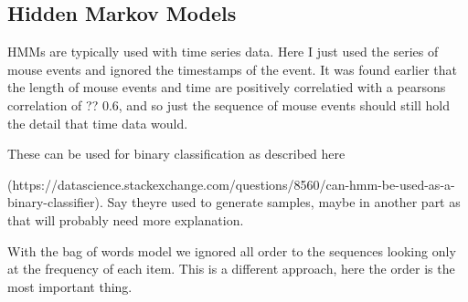 \documentclass{article}
\begin{document}
\subsection{Hidden Markov Models}


HMMs are typically used with time series data.
Here I just used the series of mouse events and ignored the timestamps of the event.
It was found earlier that the length of mouse events and time are positively correlatied with a pearsons correlation of ?? 0.6,
 and so just the sequence of mouse events should still hold the detail that time data would.

These can be used for binary classification as described here 

(https://datascience.stackexchange.com/questions/8560/can-hmm-be-used-as-a-binary-classifier). Say theyre used to generate samples, maybe in another part as that will probably need more explanation.

With the bag of words model we ignored all order to the sequences looking only at the frequency of each item.
This is a different approach, here the order is the most important thing.
\end{document}
